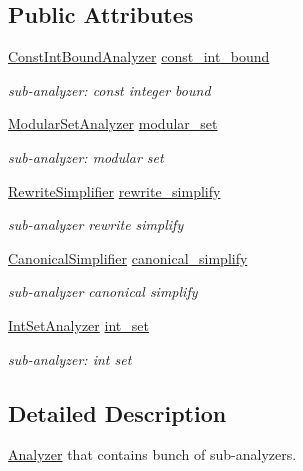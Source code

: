 \subsection*{Public Attributes}
\begin{DoxyCompactItemize}
\item 
\hyperlink{classtvm_1_1arith_1_1ConstIntBoundAnalyzer}{Const\+Int\+Bound\+Analyzer} \hyperlink{classtvm_1_1arith_1_1Analyzer_a435eba3ac3a839d3c53b74acfdc10146}{const\+\_\+int\+\_\+bound}
\begin{DoxyCompactList}\small\item\em sub-\/analyzer\+: const integer bound \end{DoxyCompactList}\item 
\hyperlink{classtvm_1_1arith_1_1ModularSetAnalyzer}{Modular\+Set\+Analyzer} \hyperlink{classtvm_1_1arith_1_1Analyzer_acac92a9522deabe289fea99efbd9eaec}{modular\+\_\+set}
\begin{DoxyCompactList}\small\item\em sub-\/analyzer\+: modular set \end{DoxyCompactList}\item 
\hyperlink{classtvm_1_1arith_1_1RewriteSimplifier}{Rewrite\+Simplifier} \hyperlink{classtvm_1_1arith_1_1Analyzer_acc86c6e8c04cb0de4ff9d78e769924b2}{rewrite\+\_\+simplify}
\begin{DoxyCompactList}\small\item\em sub-\/analyzer rewrite simplify \end{DoxyCompactList}\item 
\hyperlink{classtvm_1_1arith_1_1CanonicalSimplifier}{Canonical\+Simplifier} \hyperlink{classtvm_1_1arith_1_1Analyzer_a6cdf29adeceaa20b8c3dd7c26b92cd00}{canonical\+\_\+simplify}
\begin{DoxyCompactList}\small\item\em sub-\/analyzer canonical simplify \end{DoxyCompactList}\item 
\hyperlink{classtvm_1_1arith_1_1IntSetAnalyzer}{Int\+Set\+Analyzer} \hyperlink{classtvm_1_1arith_1_1Analyzer_a0d054ea2ea5b7e99f0883c00672ec831}{int\+\_\+set}
\begin{DoxyCompactList}\small\item\em sub-\/analyzer\+: int set \end{DoxyCompactList}\end{DoxyCompactItemize}


\subsection{Detailed Description}
\hyperlink{classtvm_1_1arith_1_1Analyzer}{Analyzer} that contains bunch of sub-\/analyzers. 

